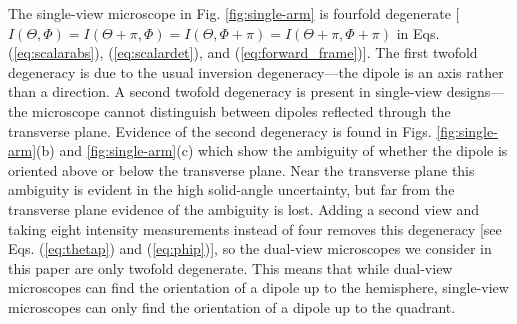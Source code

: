 \documentclass[10pt]{article}
\begin{document}
The single-view microscope in {\color{urlblue}Fig.} \ref{fig:single-arm} is
fourfold degenerate
{\color{urlblue}[}$I(\Theta, \Phi) = I(\Theta + \pi, \Phi) = I(\Theta, \Phi + \pi) = I(\Theta +
\pi, \Phi+\pi)$ in {\color{urlblue}Eqs.} (\ref{eq:scalarabs}), (\ref{eq:scalardet}),
and (\ref{eq:forward_frame}){\color{urlblue}]}. The first twofold degeneracy is due to the usual
inversion degeneracy---the dipole is an axis rather than a direction. A second
twofold degeneracy is present in single-view designs---the microscope cannot
distinguish between dipoles reflected through the transverse plane. Evidence of
the second degeneracy is found in {\color{urlblue}Figs.}
\ref{fig:single-arm}{\color{urlblue}(b)} and
\ref{fig:single-arm}{\color{urlblue}(c)} which show the ambiguity of whether the
dipole is oriented above or below the transverse plane. Near the transverse
plane this ambiguity is evident in the high solid-angle uncertainty, but far
from the transverse plane evidence of the ambiguity is lost. Adding a second
view and taking eight intensity measurements instead of four removes this
degeneracy {\color{urlblue}[}see {\color{urlblue}Eqs.} (\ref{eq:thetap}) and (\ref{eq:phip}){\color{urlblue}]}, so the dual-view
microscopes we consider in this paper are only twofold degenerate. This means
that while dual-view microscopes can find the orientation of a dipole up to the
hemisphere, single-view microscopes can only find the orientation of a dipole up
to the quadrant.
\end{document}
